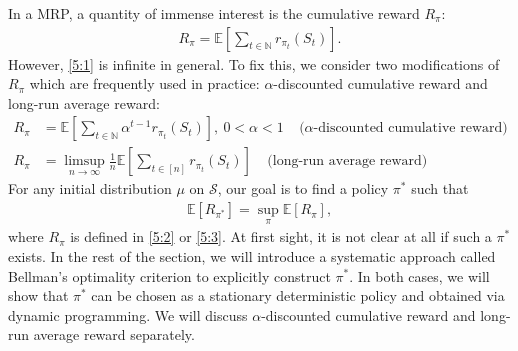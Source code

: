 \documentclass[letterpaper,11pt,openright,openany]{book}
\numberwithin{equation}{section}
\theoremstyle{plain}
\theoremstyle{definition}
\def\N{{\mathbb N}}
\def\E{{\mathbb E}}
\def\S{{\mathcal S}}
\begin{document}
In a MRP, a quantity of immense interest is the cumulative reward $R_\pi$:
\begin{align}
R_\pi = \E\left[\sum_{t\in\N}r_{\pi_t}(S_t)\right].\label{5:1}
\end{align}
However, \eqref{5:1} is infinite in general. To fix this, we consider two modifications of $R_\pi$ which are frequently used in practice: $\alpha$-discounted cumulative reward and long-run average reward:
\begin{align}
R_\pi &= \E\left[\sum_{t\in\N}\alpha^{t-1} r_{\pi_t}(S_t)\right], \ 0<\alpha<1 \ \ \ \ \ \text{($\alpha$-discounted cumulative reward)} \label{5:2}\\
R_\pi &= \limsup_{n\to\infty}\frac{1}{n}\E\left[\sum_{t\in [n]}r_{\pi_t}(S_t)\right]\ \ \ \ \ \text{(long-run average reward)} \label{5:3}
\end{align}
For any initial distribution $\mu$ on $\S$, our goal is to find a policy $\pi^*$ such that
\begin{align*}
\E[R_{\pi^*}] = \sup_{\pi}\E[R_{\pi}],
\end{align*}
where $R_\pi$ is defined in \eqref{5:2} or \eqref{5:3}. 
At first sight, it is not clear at all if such a $\pi^*$ exists. 
In the rest of the section, we will introduce a systematic approach called Bellman's optimality criterion to explicitly construct $\pi^*$. 
In both cases, we will show that $\pi^*$ can be chosen as a stationary deterministic policy and obtained via dynamic programming. 
We will discuss $\alpha$-discounted cumulative reward and long-run average reward separately. 
\end{document}
